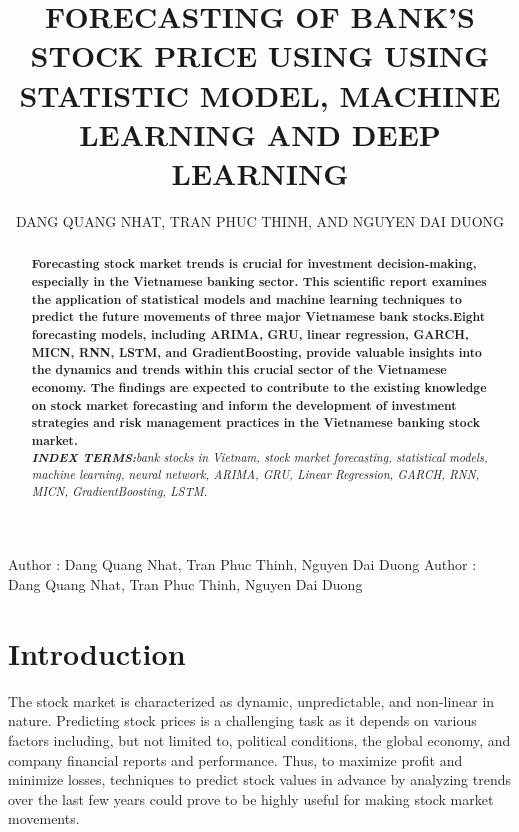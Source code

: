 \documentclass{ieeeojies}
\begin{document}
\title{\centering\LARGE\MakeUppercase{Forecasting of bank's stock price using using statistic model, machine learning and deep learning}}

\author{\uppercase{Dang Quang Nhat},
\uppercase{Tran Phuc Thinh, and Nguyen Dai Duong}}

\address[1]{21522413, Faculty of Information Systems, University of Information Technology, (e-mail: 21522413@gm.uit.edu.vn)}
\address[2]{21521475, Faculty of Information Systems, University of Information Technology, (e-mail: 21521475@gm.uit.edu.vn)}
\address[3]{21520756, Faculty of Information Systems, University of Information Technology, (e-mail: 21520756@gm.uit.edu.vn)}

\markboth
{Author \headeretal: Dang Quang Nhat, Tran Phuc Thinh, Nguyen Dai Duong}
{Author \headeretal: Dang Quang Nhat, Tran Phuc Thinh, Nguyen Dai Duong}

\begin{abstract} \par
 \textbf{Forecasting stock market trends is crucial for investment decision-making, especially in the Vietnamese banking sector. This scientific report examines the application of statistical models and machine learning techniques to predict the future movements of three major Vietnamese bank stocks.Eight forecasting models, including ARIMA, GRU, linear regression, GARCH, MICN, RNN, LSTM, and GradientBoosting, provide valuable insights into the dynamics and trends within this crucial sector of the Vietnamese economy. The findings are expected to contribute to the existing knowledge on stock market forecasting and inform the development of investment strategies and risk management practices in the Vietnamese banking stock market.}\\

\textit{\textbf{INDEX TERMS:}bank stocks in Vietnam, stock market forecasting, statistical models, machine learning, neural network, ARIMA, GRU, Linear Regression, GARCH, RNN, MICN, GradientBoosting, LSTM.}
\end{abstract}
\titlepgskip=-15pt
\maketitle

\section{Introduction}
The stock market is characterized as dynamic, unpredictable, and non-linear in nature. Predicting stock prices is a challenging task as it depends on various factors including, but not limited to, political conditions, the global economy, and company financial reports and performance. Thus, to maximize profit and minimize losses, techniques to predict stock values in advance by analyzing trends over the last few years could prove to be highly useful for making stock market movements. \cite{b1} \cite{b2}
\end{document}
